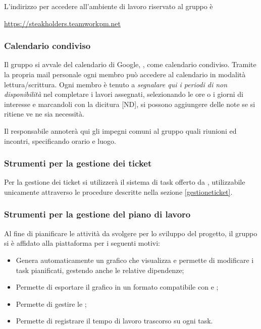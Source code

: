 		L'indirizzo per accedere all'ambiente di lavoro riservato al gruppo è
		\begin{center}
			\url{https://steakholders.teamworkpm.net}
		\end{center}
		
		\subsubsection{Calendario condiviso}
		\label{Calendario condiviso}
				
		Il gruppo si avvale del calendario di Google, , come calendario condiviso.
		Tramite la propria mail personale ogni membro può accedere al calendario in modalità lettura/scrittura.
		Ogni membro è tenuto a \emph{segnalare qui i periodi di non disponibilità} nel completare i lavori assegnati, selezionando le ore o i giorni di interesse e marcandoli con la dicitura [ND], si possono aggiungere delle note se si ritiene ve ne sia necessità. 
		
		Il responsabile annoterà qui gli impegni comuni al gruppo quali riunioni ed incontri, specificando orario e luogo.
		
		\subsubsection{Strumenti per la gestione dei ticket}
		\label{teamwork}
		Per la gestione dei ticket si utilizzerà il sistema di task offerto da , utilizzabile unicamente attraverso le procedure descritte nella sezione \ref{gestioneticket}.
		
		\subsubsection{Strumenti per la gestione del piano di lavoro}
		
		Al fine di pianificare le attività da svolgere per lo sviluppo del progetto, il gruppo si è affidato alla piattaforma  per i seguenti motivi:
		\begin{itemize}
			\item Genera automaticamente un grafico  che visualizza e permette di modificare i task pianificati, gestendo anche le relative dipendenze;
			\item Permette di esportare il grafico  in un formato compatibile con  e ;
			\item Permette di gestire le ;
			\item Permette di registrare il tempo di lavoro trascorso su ogni task.
		\end{itemize}

